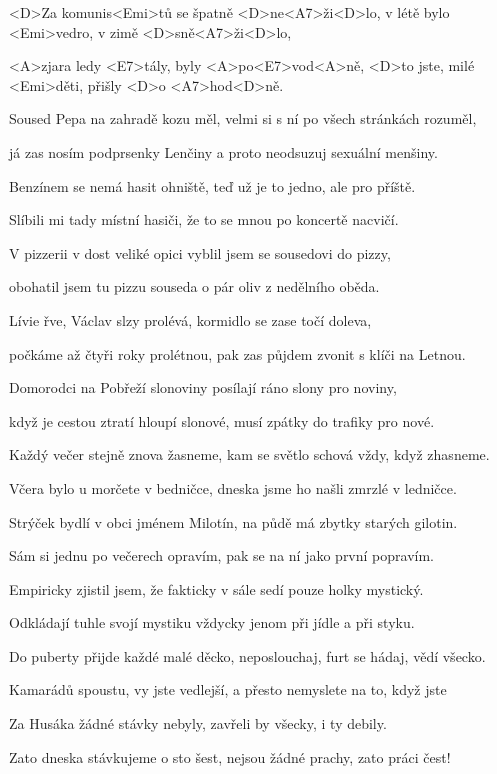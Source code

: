 

%

\zs
<D>Za komunis<Emi>tů se špatně <D>ne<A7>ži<D>lo,
v létě bylo <Emi>vedro, v zimě <D>sně<A7>ži<D>lo,

<A>zjara ledy <E7>tály, byly <A>po<E7>vod<A>ně,
<D>to jste, milé <Emi>děti, přišly <D>o <A7>hod<D>ně.
\ks

\zs
Soused Pepa na zahradě kozu měl,
velmi si s ní po všech stránkách rozuměl,

já zas nosím podprsenky Lenčiny
a proto neodsuzuj sexuální menšiny.
\ks

\zs
Benzínem se nemá hasit ohniště,
teď už je to jedno, ale pro příště.

Slíbili mi tady místní hasiči,
že to se mnou po koncertě nacvičí.
\ks

\zs
V pizzerii v dost veliké opici
vyblil jsem se sousedovi do pizzy,

obohatil jsem tu pizzu souseda
o pár oliv z nedělního oběda.
\ks

\zs
Lívie řve, Václav slzy prolévá,
kormidlo se zase točí doleva,

počkáme až čtyři roky prolétnou,
pak zas půjdem zvonit s klíči na Letnou.
\ks

\zs
Domorodci na Pobřeží slonoviny
posílají ráno slony pro noviny,

když je cestou ztratí hloupí slonové,
musí zpátky do trafiky pro nové.
\ks

\zs
Každý večer stejně znova žasneme,
kam se světlo schová vždy, když zhasneme.

Včera bylo u morčete v bedničce,
dneska jsme ho našli zmrzlé v ledničce.
\ks

\zs
Strýček bydlí v obci jménem Milotín,
na půdě má zbytky starých gilotin.

Sám si jednu po večerech opravím,
pak se na ní jako první popravím.
\ks

\zs
Empiricky zjistil jsem, že fakticky
v sále sedí pouze holky mystický.

Odkládají tuhle svojí mystiku
vždycky jenom při jídle a při styku.
\ks

\zs
Do puberty přijde každé malé děcko,
neposlouchaj, furt se hádaj, vědí všecko.

Kamarádů spoustu, vy jste vedlejší,
a přesto nemyslete na to, když jste 
\ks

\zs
Za Husáka žádné stávky nebyly,
zavřeli by všecky, i ty debily.

Zato dneska stávkujeme o sto šest,
nejsou žádné prachy, zato práci čest!
\ks
\kp
